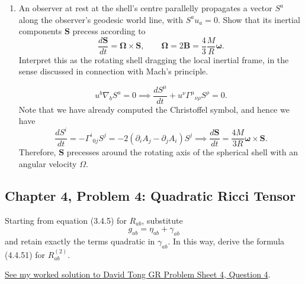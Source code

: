 \begin{enumerate}[label=\alph*)]
    \item An observer at rest at the shell's centre parallelly propagates a vector
    $S^a$ along the observer's geodesic world line, with $S^a u_a=0$. Show that
    its inertial components $\mathbf S$ precess according to
    \begin{equation}
        \frac{d\mathbf S}{dt}=\boldsymbol\Omega\times\mathbf S,
        \qquad
        \boldsymbol\Omega=2\mathbf B
        =\frac{4}{3}\frac{M}{R}\boldsymbol\omega.
    \end{equation}
    Interpret this as the rotating shell dragging the local inertial frame, in the
    sense discussed in connection with Mach's principle.
    \begin{solution}
        \begin{equation}
            u^b\nabla_b S^a = 0 \implies \frac{dS^\mu}{dt} + u^\nu \Gamma^\mu{}_{\nu\rho}S^\rho =0.
        \end{equation}
        Note that we have already computed the Christoffel symbol, and hence we have
        \begin{equation}
            \frac{dS^i}{dt} = -\Gamma^i{}_{0j}S^j = -2(\partial_i A_j - \partial_j A_i) S^j \implies \frac{d\mathbf{S}}{dt} = \frac{4M}{3R}\boldsymbol{\omega}\times \mathbf{S}.
        \end{equation}
        Therefore, $\mathbf{S}$ precesses around the rotating axis of the spherical shell with an angular velocity $\Omega$.
    \end{solution}
\end{enumerate}

\subsection{Chapter 4, Problem 4: Quadratic Ricci Tensor}

Starting from equation (3.4.5) for $R_{ab}$, substitute
\begin{equation}
    g_{ab}=\eta_{ab}+\gamma_{ab}
\end{equation}
and retain exactly the terms quadratic in $\gamma_{ab}$. In this way, derive the
formula (4.4.51) for $R^{(2)}_{ab}$.
\begin{solution}
\href{https://luca-yucheng-jin.github.io/luca-physics-site/notes/tong-gr-ps4.html#the-fierz-pauli-action-q4-health-warning-this-question-is-not-short}{See my worked solution to David Tong GR Problem Sheet 4, Question 4}.
\end{solution}


